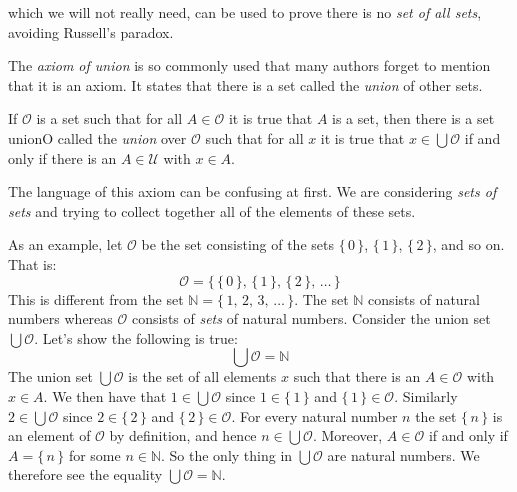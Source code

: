             which we will not really need, can be used to prove there is no
            \textit{set of all sets}, avoiding Russell's paradox.
            \par\hfill\par
            The \textit{axiom of union}
            is so commonly used that many authors
            forget to mention that it is an axiom. It states that there is a
            set called the \textit{union} of other sets.
            \begin{axiom}
                If $\mathcal{O}$ is a set such that for all $A\in\mathcal{O}$ it
                is true that $A$ is a set, then there is a set
                \gls{unionO} called the \textit{union} over
                $\mathcal{O}$ such that for all $x$ it is true that
                $x\in\bigcup\mathcal{O}$ if and only if there is an
                $A\in\mathcal{U}$ with $x\in{A}$.%
            \end{axiom}
            The language of this axiom can be confusing at first. We are
            considering \textit{sets of sets} and trying to collect together
            all of the elements of these sets.
            \begin{example}
                As an example, let $\mathcal{O}$ be the set consisting of
                the sets $\{\,0\,\}$, $\{\,1\,\}$, $\{\,2\,\}$, and so on.
                That is:
                \begin{equation}
                    \mathcal{O}=
                    \big\{\,\{\,0\,\},\,\{\,1\,\},\,\{\,2\,\},\,\dots\,\big\}
                \end{equation}
                This is different from the set
                $\mathbb{N}=\{\,1,\,2,\,3,\,\dots\,\}$. The set $\mathbb{N}$
                consists of natural numbers whereas $\mathcal{O}$ consists of
                \textit{sets} of natural numbers. Consider the union set
                $\bigcup\mathcal{O}$. Let's show the following is true:
                \begin{equation}
                    \bigcup\mathcal{O}=\mathbb{N}
                \end{equation}
                The union set $\bigcup\mathcal{O}$ is the set of all elements
                $x$ such that there is an $A\in\mathcal{O}$ with $x\in{A}$.
                We then have that $1\in\bigcup\mathcal{O}$ since
                $1\in\{\,1\,\}$ and $\{\,1\,\}\in\mathcal{O}$. Similarly
                $2\in\bigcup\mathcal{O}$ since $2\in\{\,2\,\}$ and
                $\{\,2\,\}\in\mathcal{O}$. For every natural number
                $n$ the set $\{\,n\,\}$ is an element of $\mathcal{O}$ by
                definition, and hence $n\in\bigcup\mathcal{O}$. Moreover,
                $A\in\mathcal{O}$ if and only if $A=\{\,n\,\}$ for some
                $n\in\mathbb{N}$. So the only thing in $\bigcup\mathcal{O}$
                are natural numbers. We therefore
                see the equality $\bigcup\mathcal{O}=\mathbb{N}$.
            \end{example}
